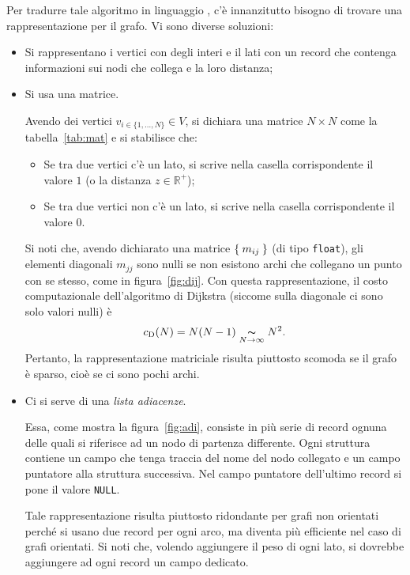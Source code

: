 Per  tradurre tale algoritmo in linguaggio , c'è innanzitutto bisogno di trovare una rappresentazione per il grafo.
Vi sono diverse soluzioni:
\begin{itemize}
	\item
Si rappresentano i vertici con degli interi e il lati con un record che contenga informazioni sui nodi che collega e la loro distanza;
	\item
Si usa una matrice.

Avendo dei vertici $v_{i\in\{1,\dots,N\}}\in V$, si dichiara una matrice $N\times N$ come la tabella~\ref{tab:mat} e si stabilisce che:
	\begin{itemize}
		\item
Se tra due vertici c'è un lato, si scrive nella casella corrispondente il valore $1$ (o la distanza $z\in\mathbb{R^{+}}$);
		\item
Se tra due vertici non c'è un lato, si scrive nella casella corrispondente il valore $0$.
	\end{itemize}
Si noti che, avendo dichiarato una matrice $\Set{m_{ij}}$ (di tipo \lstinline!float!), gli elementi diagonali $m_{jj}$ sono nulli se non esistono archi che collegano un punto con se stesso, come in figura~\ref{fig:dij}.
Con questa rappresentazione, il costo computazionale dell'algoritmo di Dijkstra (siccome sulla diagonale ci sono solo valori nulli) è
\begin{equation}
c_\textup{D}(N) = N(N-1)\underset{N\to\infty}{\thicksim} N^2.
\end{equation}
Pertanto, la rappresentazione matriciale risulta piuttosto scomoda se il grafo è sparso, cioè se ci sono pochi archi.
	\item
Ci si serve di una \emph{lista adiacenze}.

Essa, come mostra la figura~\ref{fig:adi}, consiste in più serie di record ognuna delle quali si riferisce ad un nodo di partenza differente.
Ogni struttura contiene un campo che tenga traccia del nome del nodo collegato e un campo puntatore alla struttura successiva.
Nel campo puntatore dell'ultimo record si pone il valore \lstinline!NULL!.

Tale rappresentazione risulta piuttosto ridondante per grafi non orientati perché si usano due record per ogni arco, ma diventa più efficiente nel caso di grafi orientati.
Si noti che, volendo aggiungere il peso di ogni lato, si dovrebbe aggiungere ad ogni record un campo dedicato.
\end{itemize}